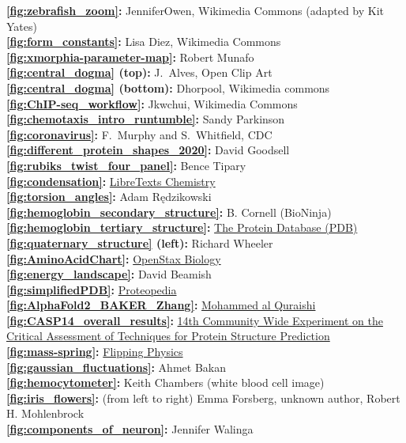 \textbf{\autoref{fig:zebrafish_zoom}:} JenniferOwen, Wikimedia Commons (adapted by Kit Yates)\\
\textbf{\autoref{fig:form_constants}:} Lisa Diez, Wikimedia Commons\\
\textbf{\autoref{fig:xmorphia-parameter-map}:} Robert Munafo\\
\textbf{\autoref{fig:central_dogma} (top):} J.~Alves, Open Clip Art\\
\textbf{\autoref{fig:central_dogma} (bottom):} Dhorpool, Wikimedia commons\\
\textbf{\autoref{fig:ChIP-seq_workflow}:} Jkwchui, Wikimedia Commons\\
\textbf{\autoref{fig:chemotaxis_intro_runtumble}:} Sandy Parkinson\\
\textbf{\autoref{fig:coronavirus}:} F.~Murphy and S.~Whitfield, CDC\\
\textbf{\autoref{fig:different_protein_shapes_2020}:} David Goodsell\\
\textbf{\autoref{fig:rubiks_twist_four_panel}:} Bence Tipary\\
\textbf{\autoref{fig:condensation}:} \href{https://bit.ly/3q0Ph8V}{LibreTexts Chemistry}\\
\textbf{\autoref{fig:torsion_angles}:} Adam Rędzikowski\\
\textbf{\autoref{fig:hemoglobin_secondary_structure}:} B. Cornell (BioNinja)\\
\textbf{\autoref{fig:hemoglobin_tertiary_structure}:} \href{https://www.rcsb.org/structure/1SI4}{The Protein Database (PDB)}\\
\textbf{\autoref{fig:quaternary_structure} (left):} Richard Wheeler\\
\textbf{\autoref{fig:AminoAcidChart}:} \href{https://openstax.org/books/biology/pages/1-introduction}{OpenStax Biology}\\
\textbf{\autoref{fig:energy_landscape}:} David Beamish\\
\textbf{\autoref{fig:simplifiedPDB}:} \href{https://proteopedia.org/wiki/index.php/Atomic_coordinate_file}{Proteopedia}\\
\textbf{\autoref{fig:AlphaFold2_BAKER_Zhang}:} \href{https://bit.ly/39Mnym3}{Mohammed al Quraishi}\\
\textbf{\autoref{fig:CASP14_overall_results}:} \href{https://predictioncenter.org/casp14/zscores_final.cgi}{14th Community Wide Experiment on the Critical Assessment of Techniques for Protein Structure Prediction}\\
\textbf{\autoref{fig:mass-spring}:} \href{flippingphysics.com}{Flipping Physics}\\
\textbf{\autoref{fig:gaussian_fluctuations}:} Ahmet Bakan\\
\textbf{\autoref{fig:hemocytometer}:} Keith Chambers (white blood cell image)\\
\textbf{\autoref{fig:iris_flowers}:} (from left to right) Emma Forsberg, unknown author, Robert H. Mohlenbrock\\
\textbf{\autoref{fig:components_of_neuron}:} Jennifer Walinga\\



\clearpage
\thispagestyle{empty}
\phantom{}
